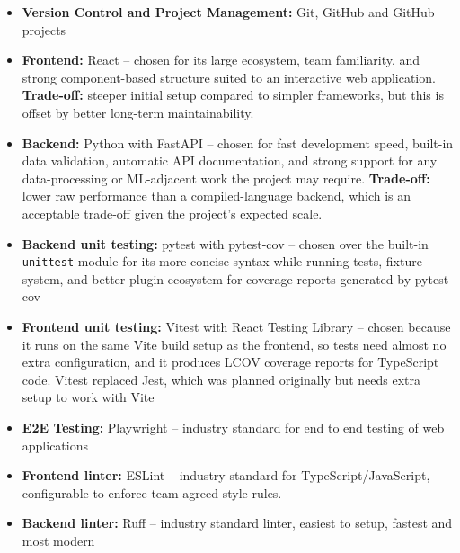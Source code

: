 \documentclass{article}
\begin{document}

\begin{itemize}
    \item \textbf{Version Control and Project Management:} Git, GitHub and GitHub projects
    \item \textbf{Frontend:} React -- chosen for its large ecosystem, team familiarity, and strong component-based structure suited to an interactive web application. \textbf{Trade-off:} steeper initial setup compared to simpler frameworks, but this is offset by better long-term maintainability.
    \item \textbf{Backend:} Python with FastAPI -- chosen for fast development speed, built-in data validation, automatic API documentation, and strong support for any data-processing or ML-adjacent work the project may require. \textbf{Trade-off:} lower raw performance than a compiled-language backend, which is an acceptable trade-off given the project's expected scale.
    \item \textbf{Backend unit testing:} pytest with pytest-cov -- chosen over the built-in \texttt{unittest} module for its more concise syntax while running tests, fixture system, and better plugin ecosystem for coverage reports generated by pytest-cov
    \item \textbf{Frontend unit testing:} Vitest with React Testing Library -- chosen because it runs on the same Vite build setup as the frontend, so tests need almost no extra configuration, and it produces LCOV coverage reports for TypeScript code. Vitest replaced Jest, which was planned originally but needs extra setup to work with Vite
    \item \textbf{E2E Testing:} Playwright -- industry standard for end to end testing of web applications
    \item \textbf{Frontend linter:} ESLint -- industry standard for TypeScript/JavaScript, configurable to enforce team-agreed style rules.
    \item \textbf{Backend linter:} Ruff -- industry standard linter, easiest to setup, fastest and most modern

\end{itemize}
\end{document}
